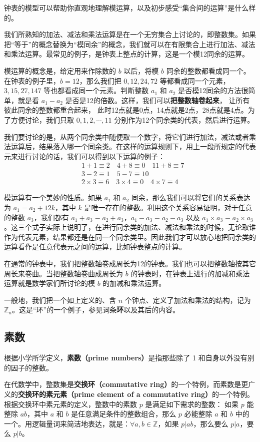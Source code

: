 钟表的模型可以帮助你直观地理解模运算，以及初步感受“集合间的运算”是什么样的。

我们所熟知的加法、减法和乘法运算是在一个无穷集合上讨论的，即整数集。如果把“等于”的概念替换为“模同余”的概念，我们就可以在有限集合上进行加法、减法和乘法运算。最常见的例子，是钟表上整点的计算，这是一个模12同余的运算。

模运算的概念是，给定用来作除数的 $b$ 以后，将模 $b$ 同余的整数都看成同一个。在钟表的例子里，$b=12$，那么我们把 $0,12,24,72$ 等都看成同一个元素，$3,15,27,147$ 等也都看成同一个元素。判断整数 $a_1$ 和 $a_2$ 是否模12同余的方法很简单，就是看 $a_1-a_2$ 是否是12的倍数。这样，我们可以\textbf{把整数轴卷起来}， 让所有彼此同余的整数都重合起来， 此时12点就是0点，14点就是2点，28点就是4点。为了方便讨论，我们只取 $0,1,2,\cdots,11$ 分别作为12个同余类的代表，然后进行运算。

我们要讨论的是，从两个同余类中随便取一个数字，将它们进行加法，减法或者乘法运算后，结果落入哪一个同余类。在这样的运算规则下，用上一段所规定的代表元来进行讨论的话，我们可以得到以下运算的例子：
\begin{equation}
\begin{aligned}
&1+1\equiv 2 \quad 4+8\equiv 0 \quad 11+8\equiv 7 \\
&3-2\equiv 1 \quad 5-7\equiv 10 \\
&2\times 3\equiv 6 \quad 3\times 4\equiv 0 \quad 4\times 7\equiv 4
\end{aligned}
\end{equation}

模运算有一个美妙的性质。如果 $a_1$ 和 $a_2$ 同余，那么我们可以将它们的关系表达为 $a_1=a_2+12k$，其中 $k$ 是唯一存在的整数。利用这个关系容易证明，对于任意的整数 $a_3$，我们都有 $a_1+a_3\equiv a_2+a_3$，$a_1-a_3\equiv a_2-a_3$ 以及 $a_1\times a_3\equiv a_2\times a_3$。这三个式子实际上说明了，在进行同余类的加法、减法和乘法的时候，无论取谁作为代表元素，结果都还是在同一个同余类里。因此我们才可以放心地把同余类的运算看作是任意代表元之间的运算，比如钟表整点的计算。

在通常的钟表中，我们把整数轴卷成周长为12的钟表。我们也可以把整数轴按其它周长来卷曲。当把整数轴卷曲成周长为 $b$ 的钟表时，在钟表上进行的加减和乘法运算就是数学家们所讨论的模 $b$ 的加减和乘法运算。

一般地，我们把一个如上定义的、含 $n$ 个钟点、定义了加法和乘法的结构，记为 $\mathbb{Z}_n$。这是“环”的一个例子，参见词条\textbf{环}以及其后的内容。

\subsection{素数}

根据小学所学定义，\textbf{素数（prime numbers）}是指那些除了 1 和自身以外没有别的因子的整数。

在代数学中，整数集是\textbf{交换环（commutative ring）}的一个特例，而素数是更广义的\textbf{交换环的素元素（prime element of a commutative ring）}的一个特例。根据交换环中素元素的定义，整数中的素数 $p$ 是满足如下需求的整数：
如果 $p$ 能整除 $ab$，其中 $a$ 和 $b$ 是任意满足条件的整数组合，那么 $p$ 必能整除 $a$ 和 $b$ 中的一个。用逻辑量词来简洁地表达，就是：$\forall a, b\in \mathbb{Z}$，如果 $p|ab$，那么要么 $p|a$，要么 $p|b$。 
